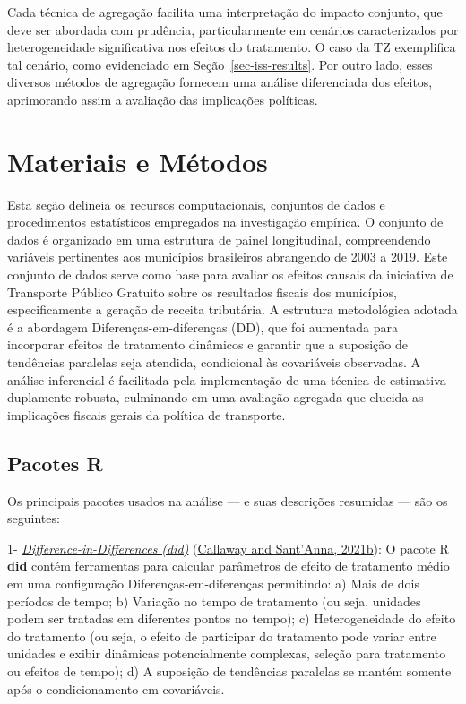 \documentclass[12pt, a4paper, twoside]{article}
\numberwithin{equation}{subsection} %
\begin{document}
Cada técnica de agregação facilita uma interpretação do impacto
conjunto, que deve ser abordada com prudência, particularmente em
cenários caracterizados por heterogeneidade significativa nos efeitos do
tratamento. O caso da TZ exemplifica tal cenário, como evidenciado em
Seção~\ref{sec-iss-results}. Por outro lado, esses diversos métodos de
agregação fornecem uma análise diferenciada dos efeitos, aprimorando
assim a avaliação das implicações políticas.

\newpage

\hypertarget{sec-materials-methods}{%
\section{Materiais e Métodos}\label{sec-materials-methods}}

Esta seção delineia os recursos computacionais, conjuntos de dados e
procedimentos estatísticos empregados na investigação empírica. O
conjunto de dados é organizado em uma estrutura de painel longitudinal,
compreendendo variáveis \hspace{0pt}\hspace{0pt}pertinentes aos
municípios brasileiros abrangendo de 2003 a 2019. Este conjunto de dados
serve como base para avaliar os efeitos causais da iniciativa de
Transporte Público Gratuito sobre os resultados fiscais dos municípios,
especificamente a geração de receita tributária. A estrutura
metodológica adotada é a abordagem Diferenças-em-diferenças (DD), que
foi aumentada para incorporar efeitos de tratamento dinâmicos e garantir
que a suposição de tendências paralelas seja atendida, condicional às
covariáveis \hspace{0pt}\hspace{0pt}observadas. A análise inferencial é
facilitada pela implementação de uma técnica de estimativa duplamente
robusta, culminando em uma avaliação agregada que elucida as implicações
fiscais gerais da política de transporte.

\hypertarget{sec-r-packages}{%
\subsection{Pacotes R}\label{sec-r-packages}}

Os principais pacotes usados \hspace{0pt}\hspace{0pt}na análise --- e
suas descrições resumidas --- são os seguintes:

1- \textit{\underline{Difference-in-Differences (did)}}
(\protect\hyperlink{ref-did_r}{Callaway and Sant'Anna, 2021b}): O pacote
R \textbf{did} contém ferramentas para calcular parâmetros de efeito de
tratamento médio em uma configuração Diferenças-em-diferenças
permitindo: a) Mais de dois períodos de tempo; b) Variação no tempo de
tratamento (ou seja, unidades podem ser tratadas em diferentes pontos no
tempo); c) Heterogeneidade do efeito do tratamento (ou seja, o efeito de
participar do tratamento pode variar entre unidades e exibir dinâmicas
potencialmente complexas, seleção para tratamento ou efeitos de tempo);
d) A suposição de tendências paralelas se mantém somente após o
condicionamento em covariáveis.
\end{document}
